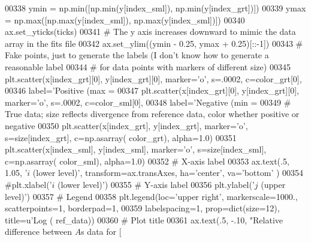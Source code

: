 \begin{DoxyCode}
00338                     ymin = np.min([np.min(y[index\_sml]), np.min(y[index\_grt])])
00339                     ymax = np.max([np.max(y[index\_sml]), np.max(y[index\_sml])])
00340                     ax.set\_yticks(ticks)
00341                     \textcolor{comment}{# The y axis increases downward to mimic the data array in the fits file}
00342                     ax.set\_ylim((ymin - 0.25, ymax + 0.25)[::-1])
00343                     \textcolor{comment}{# Fake points, just to generate the labels (I don't know how to generate a reasonable
       label}
00344                     \textcolor{comment}{# for data points with markers of different size)}
00345                     plt.scatter(x[index\_grt][0], y[index\_grt][0], marker=\textcolor{stringliteral}{'o'}, s=.0002, c=color\_grt[0],
00346                                 label=\textcolor{stringliteral}{'Positive (max = %
00347                     plt.scatter(x[index\_grt][0], y[index\_grt][0], marker=\textcolor{stringliteral}{'o'}, s=.0002, c=color\_sml[0],
00348                                 label=\textcolor{stringliteral}{'Negative (min = %
00349                     \textcolor{comment}{# True data; size reflects divergence from reference data, color whether positive or
       negative}
00350                     plt.scatter(x[index\_grt], y[index\_grt], marker=\textcolor{stringliteral}{'o'}, s=size[index\_grt], c=np.asarray(
      color\_grt), alpha=1.0)
00351                     plt.scatter(x[index\_sml], y[index\_sml], marker=\textcolor{stringliteral}{'o'}, s=size[index\_sml], c=np.asarray(
      color\_sml), alpha=1.0)
00352                     \textcolor{comment}{# X-axis label }
00353                     ax.text(.5, 1.05, \textcolor{stringliteral}{'$i$ (lower level)'}, transform=ax.transAxes, ha=\textcolor{stringliteral}{'center'}, va=\textcolor{stringliteral}{'bottom'}
      )
00354                     \textcolor{comment}{#plt.xlabel('$i$ (lower level)')}
00355                     \textcolor{comment}{# Y-axis label}
00356                     plt.ylabel(\textcolor{stringliteral}{'$j$ (upper level)'})
00357                     \textcolor{comment}{# Legend}
00358                     plt.legend(loc=\textcolor{stringliteral}{'upper right'}, markerscale=1000., scatterpoints=1, borderpad=1,
00359                                labelspacing=1, prop=dict(size=12), title=\textcolor{stringliteral}{u'Log (%
      ref\_data))
00360                     \textcolor{comment}{# Plot title}
00361                     ax.text(.5, -.10, \textcolor{stringliteral}{"Relative difference between $A$s data for [%
}}}}
\end{DoxyCode}
